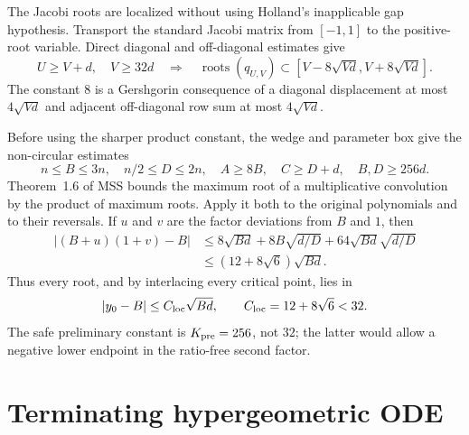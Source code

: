\documentclass[12pt]{article}
\begin{document}
The Jacobi roots are localized without using Holland's inapplicable gap
hypothesis.  Transport the standard Jacobi matrix from $[-1,1]$ to the
positive-root variable.  Direct diagonal and off-diagonal estimates give
\begin{equation}\label{eq:jacobi-local}
 U\ge V+d,\quad V\ge32d
 \quad\Longrightarrow\quad
 \operatorname{roots}(q_{U,V})\subset
 [V-8\sqrt{Vd},V+8\sqrt{Vd}].
\end{equation}
The constant $8$ is a Gershgorin consequence of a diagonal displacement at
most $4\sqrt{Vd}$ and adjacent off-diagonal row sum at most
$4\sqrt{Vd}$.

Before using the sharper product constant, the wedge and parameter box give
the non-circular estimates
\begin{equation}\label{eq:coarse-parameter}
 n\le B\le3n,\quad n/2\le D\le2n,\quad
 A\ge8B,\quad C\ge D+d,\quad B,D\ge256d.
\end{equation}
Theorem~1.6 of MSS bounds the maximum root of a multiplicative convolution
by the product of maximum roots.  Apply it both to the original polynomials
and to their reversals.  If $u$ and $v$ are the factor deviations from $B$
and $1$, then
\begin{align}
 |(B+u)(1+v)-B|
 &\le8\sqrt{Bd}+8B\sqrt{d/D}
       +64\sqrt{Bd}\sqrt{d/D}\nonumber\\
 &\le(12+8\sqrt6)\sqrt{Bd}.
 \label{eq:product-localization}
\end{align}
Thus every root, and by interlacing every critical point, lies in
\begin{equation}\label{eq:localization}
 |y_0-B|\le C_{\rm loc}\sqrt{Bd},\qquad
 C_{\rm loc}=12+8\sqrt6<32.
\end{equation}
The safe preliminary constant is $K_{\rm pre}=256$, not $32$; the latter
would allow a negative lower endpoint in the ratio-free second factor.

\section{Terminating hypergeometric ODE}\label{sec:ode}
\end{document}
